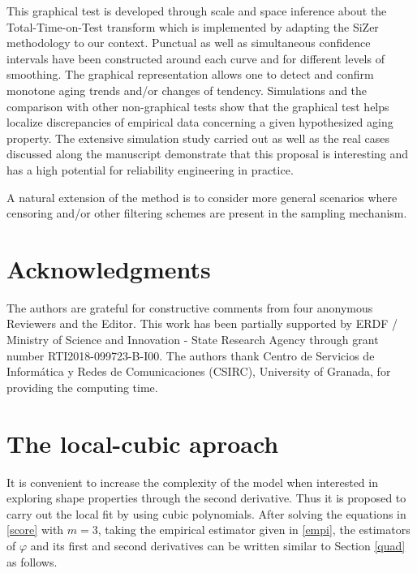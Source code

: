 \documentclass[preprint,12pt]{elsarticle}
\begin{document}
  This graphical test is developed through scale and space inference about the Total-Time-on-Test transform which is implemented by adapting the SiZer methodology to our context. Punctual as well as simultaneous confidence intervals have been constructed around each curve and for different levels of smoothing. The graphical representation allows one to detect and confirm monotone aging trends and/or changes of tendency.
Simulations and the comparison with other non-graphical tests show that the graphical test helps localize discrepancies of empirical data concerning a given hypothesized aging property. The extensive simulation study carried out as well as the real cases discussed along the manuscript demonstrate that this proposal is interesting and has a high potential for reliability engineering in practice. 

A natural extension of the method is to consider more general scenarios where censoring and/or other filtering schemes are present in the sampling mechanism.



\section*{Acknowledgments} The authors are grateful for constructive comments from four anonymous Reviewers and the Editor. This work has been partially supported by ERDF / Ministry of Science and Innovation - State Research Agency through grant number RTI2018-099723-B-I00. The authors thank Centro de Servicios de Inform\'atica y Redes de Comunicaciones (CSIRC), University of Granada, for providing the computing time. 


%

\appendix

\section{The local-cubic aproach} \label{ap:cubic}
It is convenient to increase the complexity of the model when interested in exploring shape properties through the second derivative.
Thus it is proposed to carry out the local fit by using cubic polynomials. After solving the equations in \eqref{score} with $m=3$, taking  the empirical estimator given in \eqref{empi},  the estimators of $\varphi$ and its first and second derivatives can be written similar to Section \ref{quad} as follows.
%
\end{document}
